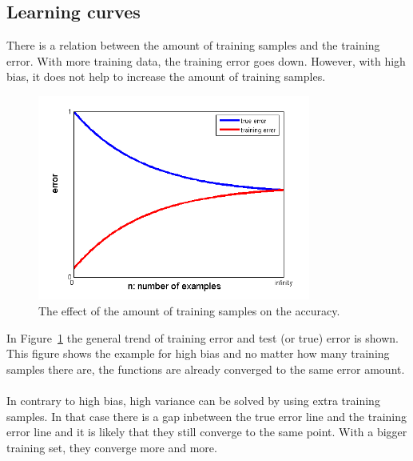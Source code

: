 \subsection{Learning curves}
There is a relation between the amount of training samples and the training error. With more training data, the training error goes down. However, with high bias, it does not help to increase the amount of training samples.
\begin{figure}[H]
\centering
\includegraphics[width=0.8\textwidth]{Figures/bias_variance_chart}
\decoRule
\caption[Training samples comparison]{The effect of the amount of training samples on the accuracy.}
\label{fig:trainingsamples}
\end{figure}
\noindent In Figure~\ref{fig:trainingsamples} the general trend of training error and test (or true) error is shown. This figure shows the example for high bias and no matter how many training samples there are, the functions are already converged to the same error amount.\\\\
In contrary to high bias, high variance can be solved by using extra training samples. In that case there is a gap inbetween the true error line and the training error line and it is likely that they still converge to the same point. With a bigger training set, they converge more and more.

